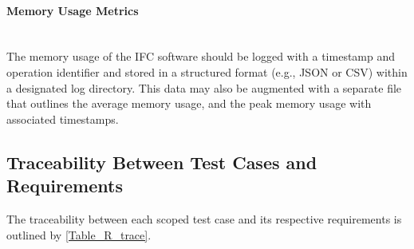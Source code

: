 \documentclass[12pt, titlepage]{article}
\begin{document}
\paragraph{Memory Usage Metrics}
\mbox{}
\\
The memory usage of the IFC software should be logged with a timestamp and operation identifier and stored 
in a structured format (e.g., JSON or CSV) within a designated log directory. This data may also be augmented 
with a separate file that outlines the average memory usage, and the peak memory usage with associated 
timestamps.



\newpage
\subsection{Traceability Between Test Cases and Requirements}
The traceability between each scoped test case and its respective requirements is outlined by 
\ref{Table_R_trace}.
\end{document}

